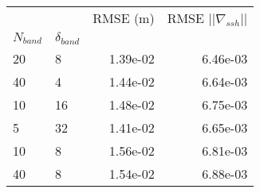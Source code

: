 \begin{tabular}{llrr}
\toprule
 &  & RMSE (m) & RMSE $|| \nabla_{ssh} ||$ \\
$N_{band}$ & $\delta_{band}$ &  &  \\
\midrule
20 & 8 & 1.39e-02 & 6.46e-03 \\
40 & 4 & 1.44e-02 & 6.64e-03 \\
10 & 16 & 1.48e-02 & 6.75e-03 \\
5 & 32 & 1.41e-02 & 6.65e-03 \\
10 & 8 & 1.56e-02 & 6.81e-03 \\
40 & 8 & 1.54e-02 & 6.88e-03 \\
\bottomrule
\end{tabular}
